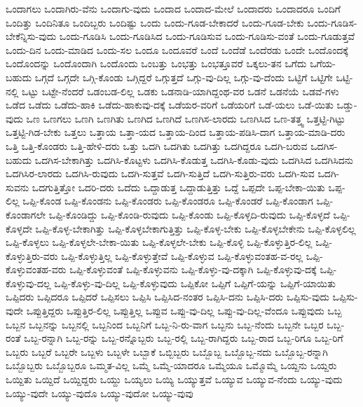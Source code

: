 {ಒಂದಾಗಲು
ಒಂದಾಗಿರು-ವೆನು
ಒಂದಾಗು-ವುದು
ಒಂದಾದ
ಒಂದಾದ-ಮೇಲೆ
ಒಂದಾದರು
ಒಂದಾದರೂ
ಒಂದಿಗೆ
ಒಂದಿತ್ತು
ಒಂದಿನಿತೂ
ಒಂದಿಬ್ಬರು
ಒಂದಿಷ್ಟು
ಒಂದು
ಒಂದು-ಗೂಡ-ಬೇಕಾದರೆ
ಒಂದು-ಗೂಡ-ಬೇಕು
ಒಂದು-ಗೂಡಿಸ-ಬೇಕೆನ್ನಿಸು-ವುದು
ಒಂದು-ಗೂಡಿಸಿ
ಒಂದು-ಗೂಡಿಸಿದ
ಒಂದು-ಗೂಡಿಸುವ
ಒಂದು-ಗೂಡಿಸು-ವಂತೆ
ಒಂದು-ಗೂಡುತ್ತವೆ
ಒಂದು-ದಿನ
ಒಂದು-ಮಾಡಿದ
ಒಂದು-ಸಲ
ಒಂದೂ
ಒಂದೂವರೆ
ಒಂದೆ
ಒಂದೆಡೆ
ಒಂದೆರಡು
ಒಂದೇ
ಒಂದೊಂದಕ್ಕೆ
ಒಂದೊಂದನ್ನು
ಒಂದೊಂದಾಗಿ
ಒಂದೊಂದು
ಒಂಬತ್ತು
ಒಂಭತ್ತು
ಒಂಭತ್ತೂವರೆ
ಒಕ್ಕಲು-ತನ
ಒಗೆದು
ಒಗೆಯ-ಬಹುದು
ಒಗ್ಗದೆ
ಒಗ್ಗದೇ
ಒಗ್ಗಿ-ಕೊಂಡು
ಒಗ್ಗಿದ್ದರೆ
ಒಗ್ಗುತ್ತದೆ
ಒಗ್ಗು-ವು-ದಿಲ್ಲ
ಒಗ್ಗು-ವು-ದೆಂದು
ಒಟ್ಟಿಗೆ
ಒಟ್ಟಿಗೇ
ಒಟ್ಟಿ-ನಲ್ಲಿ
ಒಟ್ಟು
ಒಟ್ಟೇ-ನೆಂದರೆ
ಒಡಂಬಡ-ಲಿಲ್ಲ
ಒಡಕು
ಒಡನಾಡಿ-ಯಾಗಿದ್ದಂಥ-ವರ
ಒಡನೆ
ಒಡನೆಯೆ
ಒಡವೆ-ಗಳು
ಒಡೆದ
ಒಡೆದು
ಒಡೆದು-ಹಾಕಿ
ಒಡೆದು-ಹಾಕುವು-ದಕ್ಕೆ
ಒಡೆಯರ-ವರಿಗೆ
ಒಡೆಯರಿಗೆ
ಒಡೆ-ಯಲು
ಒಡೆ-ಯಿತು
ಒಡ್ಡು-ವುದು
ಒಣ
ಒಣಗಲು
ಒಣಗಿ
ಒಣಗಿತು
ಒಣಗಿದ
ಒಣಗಿದೆ
ಒಣಗಿಸ-ಲಾರದು
ಒಣಗಿಸಿದ
ಒಣ-ತತ್ತ್ವ
ಒತ್ತಟ್ಟಿ-ಗಿಟ್ಟು
ಒತ್ತಟ್ಟಿ-ಗಿಡ-ಬೇಕು
ಒತ್ತಲು
ಒತ್ತಾಯ
ಒತ್ತಾ-ಯದ
ಒತ್ತಾಯ-ದಿಂದ
ಒತ್ತಾಯ-ಪಡಿಸಿ-ದಾಗ
ಒತ್ತಾಯ-ಮಾಡಿ-ದರು
ಒತ್ತಿ
ಒತ್ತಿ-ಕೊಂಡರು
ಒತ್ತಿ-ಹೇಳಿ-ದರು
ಒತ್ತು
ಒದಗಿ
ಒದಗಿತು
ಒದಗಿತ್ತು
ಒದಗಿದ್ದರೂ
ಒದಗಿ-ಬರುವ
ಒದಗಿಸ-ಬಹುದು
ಒದಗಿಸ-ಬೇಕಾಗಿತ್ತು
ಒದಗಿಸಿ-ಕೊಟ್ಟಳು
ಒದಗಿಸಿ-ಕೊಡುತ್ತ
ಒದಗಿಸಿ-ಕೊಡು-ವುದು
ಒದಗಿಸಿದ
ಒದಗಿಸಿದನು
ಒದಗಿಸಿರ-ಲಾರದು
ಒದಗಿಸಿ-ರುವುದು
ಒದಗಿ-ಸುತ್ತವೆ
ಒದಗಿ-ಸುತ್ತಿದೆ
ಒದಗಿ-ಸುತ್ತಿರು-ವರು
ಒದಗಿ-ಸುವ
ಒದಗಿ-ಸುವನು
ಒದಗುತ್ತಿತ್ತೋ
ಒದರಿ-ದರು
ಒದೆದು
ಒದ್ದಾಡುತ್ತ
ಒದ್ದಾಡುತ್ತಿತ್ತು
ಒದ್ದೆ
ಒಪ್ಪದೇ
ಒಪ್ಪ-ಬೇಕಾ-ಯಿತು
ಒಪ್ಪ-ಲಿಲ್ಲ
ಒಪ್ಪಿ-ಕೊಂಡ
ಒಪ್ಪಿ-ಕೊಂಡನು
ಒಪ್ಪಿ-ಕೊಂಡರು
ಒಪ್ಪಿ-ಕೊಂಡರೂ
ಒಪ್ಪಿ-ಕೊಂಡರೆ
ಒಪ್ಪಿ-ಕೊಂಡಾಗ
ಒಪ್ಪಿ-ಕೊಂಡಾಗಲೇ
ಒಪ್ಪಿ-ಕೊಂಡಿದ್ದು
ಒಪ್ಪಿ-ಕೊಂಡಿ-ರುವುದು
ಒಪ್ಪಿ-ಕೊಂಡು
ಒಪ್ಪಿ-ಕೊಳ್ಳದಿ-ರುವುದು
ಒಪ್ಪಿ-ಕೊಳ್ಳದೆ
ಒಪ್ಪಿ-ಕೊಳ್ಳದೇ
ಒಪ್ಪಿ-ಕೊಳ್ಳ-ಬೇಕಾಗಿತ್ತು
ಒಪ್ಪಿ-ಕೊಳ್ಳಬೇಕಾಗುತ್ತಿತ್ತು
ಒಪ್ಪಿ-ಕೊಳ್ಳ-ಬೇಕು
ಒಪ್ಪಿ-ಕೊಳ್ಳಬೇಕೇನು
ಒಪ್ಪಿ-ಕೊಳ್ಳಲಿಲ್ಲ
ಒಪ್ಪಿ-ಕೊಳ್ಳಲು
ಒಪ್ಪಿ-ಕೊಳ್ಳಲೇ-ಬೇಕಾ-ಯಿತು
ಒಪ್ಪಿ-ಕೊಳ್ಳಲೇ-ಬೇಕು
ಒಪ್ಪಿ-ಕೊಳ್ಳಿ
ಒಪ್ಪಿ-ಕೊಳ್ಳುತ್ತಿರ-ಲಿಲ್ಲ
ಒಪ್ಪಿ-ಕೊಳ್ಳುತ್ತಿರು-ವರು
ಒಪ್ಪಿ-ಕೊಳ್ಳುತ್ತಿಲ್ಲ
ಒಪ್ಪಿ-ಕೊಳ್ಳುತ್ತೇವೆ
ಒಪ್ಪಿ-ಕೊಳ್ಳುವ
ಒಪ್ಪಿ-ಕೊಳ್ಳುವಂತಹ-ವ-ರಲ್ಲ
ಒಪ್ಪಿ-ಕೊಳ್ಳುವಂತಹ-ವರು
ಒಪ್ಪಿ-ಕೊಳ್ಳುವಂತೆ
ಒಪ್ಪಿ-ಕೊಳ್ಳುವನು
ಒಪ್ಪಿ-ಕೊಳ್ಳು-ವು-ದಕ್ಕಾಗಿ
ಒಪ್ಪಿ-ಕೊಳ್ಳುವು-ದಕ್ಕೆ
ಒಪ್ಪಿ-ಕೊಳ್ಳುವು-ದಲ್ಲ
ಒಪ್ಪಿ-ಕೊಳ್ಳು-ವು-ದಿಲ್ಲ
ಒಪ್ಪಿ-ಕೊಳ್ಳುವುದು
ಒಪ್ಪಿಕೋ
ಒಪ್ಪಿಗೆ
ಒಪ್ಪಿಗೆ-ಯನ್ನು
ಒಪ್ಪಿಗೆ-ಯಾಯಿತು
ಒಪ್ಪಿದರು
ಒಪ್ಪಿದರೂ
ಒಪ್ಪಿದರೆ
ಒಪ್ಪಿಸಲು
ಒಪ್ಪಿಸಿ
ಒಪ್ಪಿಸಿದ-ನಂತರ
ಒಪ್ಪಿಸಿ-ದನು
ಒಪ್ಪಿಸಿ-ದರು
ಒಪ್ಪಿಸು-ವುದು
ಒಪ್ಪಿಸು-ವುದೇ
ಒಪ್ಪುತ್ತಿದ್ದರು
ಒಪ್ಪುತ್ತಿರ-ಲಿಲ್ಲ
ಒಪ್ಪುತ್ತಿಲ್ಲ
ಒಪ್ಪುವ
ಒಪ್ಪು-ವು-ದಿಲ್ಲ
ಒಪ್ಪು-ವು-ದಿಲ್ಲ-ವೆಂದೂ
ಒಪ್ಪುವುದು
ಒಬ್ಬ
ಒಬ್ಬನ
ಒಬ್ಬನನ್ನು
ಒಬ್ಬನಲ್ಲಿ
ಒಬ್ಬನಿಂದ
ಒಬ್ಬನಿಗೆ
ಒಬ್ಬ-ನಿ-ರು-ವಾಗ
ಒಬ್ಬನು
ಒಬ್ಬ-ನೆಂದು
ಒಬ್ಬನೇ
ಒಬ್ಬರ
ಒಬ್ಬ-ರಂತೆ
ಒಬ್ಬ-ರನ್ನಾಗಿ
ಒಬ್ಬ-ರನ್ನು
ಒಬ್ಬ-ರನ್ನೊಬ್ಬರು
ಒಬ್ಬ-ರಲ್ಲಿ
ಒಬ್ಬ-ರಾಗಿದ್ದರು
ಒಬ್ಬ-ರಾದ
ಒಬ್ಬ-ರಿಗೂ
ಒಬ್ಬ-ರಿಗೆ
ಒಬ್ಬರು
ಒಬ್ಬರೆ
ಒಬ್ಬರೇ
ಒಬ್ಬಳು
ಒಬ್ಬಳೇ
ಒಬ್ಬಾಕೆ
ಒಬ್ಬಿಬ್ಬರು
ಒಬ್ಬೊಬ್ಬ
ಒಬ್ಬೊಬ್ಬ-ನದು
ಒಬ್ಬೊಬ್ಬ-ರನ್ನಾಗಿ
ಒಬ್ಬೊಬ್ಬರು
ಒಬ್ಬೊಬ್ಬರೂ
ಒಮ್ಮತ-ವಿಲ್ಲ
ಒಮ್ಮೆ
ಒಮ್ಮೆ-ಯಾದರೂ
ಒಮ್ಮೆಯೂ
ಒಮ್ಮೊಮ್ಮೆ
ಒಯ್ದನು
ಒಯ್ದರು
ಒಯ್ದಿತು
ಒಯ್ದಿದೆ
ಒಯ್ದಿದ್ದರು
ಒಯ್ದು
ಒಯ್ಯಲು
ಒಯ್ಯಿ
ಒಯ್ಯುತ್ತವೆ
ಒಯ್ಯುವ
ಒಯ್ಯುವ-ನೆಂದು
ಒಯ್ಯು-ವುದು
ಒಯ್ಯು-ವುದೇ
ಒಯ್ಯು-ವುದೊ
ಒಯ್ಯು-ವುದೋ
ಒಯ್ಯು-ವುವು
}

